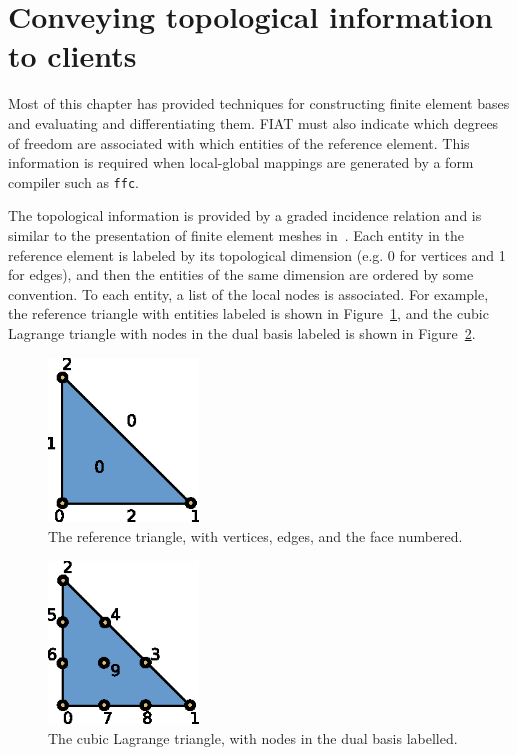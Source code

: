 \section{Conveying topological information to clients}
Most of this chapter has provided techniques for constructing finite
element bases and evaluating and differentiating them.  
FIAT must also indicate which degrees of freedom are
associated with which entities of the reference element.  This
information is required when local-global mappings are generated by a
form compiler such as \texttt{ffc}. 

The topological information is provided by a graded incidence relation
and is similar to the presentation of finite element meshes in~\cite{Log09}.  
Each entity in the reference element is
labeled by its topological dimension (e.g. 0 for vertices and 1 for
edges), and then the entities of the same dimension are ordered by
some convention.  To each entity, a list of the local nodes is
associated.  For example, the reference triangle with entities labeled
is shown in Figure~\ref{fig:reftri}, and the
cubic Lagrange triangle with nodes in the dual basis labeled is
shown in Figure~\ref{fig:p3}.  

\begin{figure}[H]
  \label{fig:reftri}
  \begin{center}
    \includegraphics[width=4cm]{chapters/kirby-2/eps/reftri.eps}
    \caption{The reference triangle, with vertices, edges, and the
      face numbered.}
  \end{center}
\end{figure}

\begin{figure}[H]
  \label{fig:p3}
  \begin{center}
    \includegraphics[width=4cm]{chapters/kirby-2/eps/P3.eps}
    \caption{The cubic Lagrange triangle, with nodes in the dual basis
      labelled.}
  \end{center}
\end{figure}

